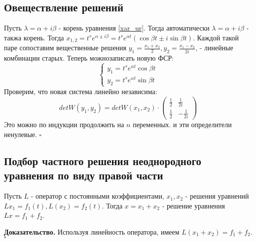 \subsection{Овеществление решений}
Пусть $\lambda = \alpha+i\beta$ - корень уравнения 
\ref{xar_ur}. Тогда автоматически $\lambda = \alpha + i\beta$ - такжа корень.
Тогда
$x_{1,2}=t^se^{\alpha\pm i\beta}=t^se^{\alpha t}(\cos\beta t\pm i\sin\beta t)$.
Каждой такой паре сопоставим вещественные решения 
$y_1=\frac{x_1+x_2}{2},y_2=\frac{x_1-x_2}{2i}$, - линейные комбинации старых. 
Теперь можнозаписать новую ФСР:
$$\begin{cases}
    y_1 = t^se^{\alpha t}\cos\beta t\\ 
    y_2 = t^se^{\alpha t}\sin\beta t
\end{cases}$$ 
Проверим, что новая система линейно независима:
        $$detW(y_1,y_2)=detW(x_1,x_2)\cdot 
        \begin{pmatrix} \frac{1}{2} & \frac{1}{2i} \\
            \frac{1}{2} & -\frac{1}{2i} 
        \end{pmatrix} $$
Это можно по индукции продолжить на $n$ переменных. и эти определители
ненулевые. $\square$ \\

\subsection{Подбор частного решения неоднородного уравнения по виду 
правой части}

\begin{theor}
Пусть $L$ - оператор с постоянными коэффициентами,  $x_1,x_2$ - решения 
уравнений $Lx_1=f_1(t),L(x_2)=f_2(t)$. Тогда
$x=x_1+x_2$ - решение уравнения $Lx = f_1+f_2$. 
\end{theor}
\textbf{Доказательство.} Используя линейность оператора, имеем
$L(x_1+x_2)=f_1+f_2$. $\square$ 

